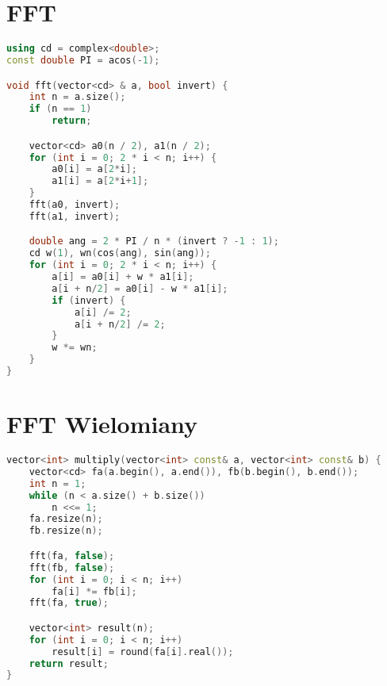 \documentclass[notitlepage]{report}
\begin{document}
\section*{FFT}
\begin{lstlisting}[language=C++,basicstyle=\footnotesize]
using cd = complex<double>;
const double PI = acos(-1);

void fft(vector<cd> & a, bool invert) {
    int n = a.size();
    if (n == 1)
        return;

    vector<cd> a0(n / 2), a1(n / 2);
    for (int i = 0; 2 * i < n; i++) {
        a0[i] = a[2*i];
        a1[i] = a[2*i+1];
    }
    fft(a0, invert);
    fft(a1, invert);

    double ang = 2 * PI / n * (invert ? -1 : 1);
    cd w(1), wn(cos(ang), sin(ang));
    for (int i = 0; 2 * i < n; i++) {
        a[i] = a0[i] + w * a1[i];
        a[i + n/2] = a0[i] - w * a1[i];
        if (invert) {
            a[i] /= 2;
            a[i + n/2] /= 2;
        }
        w *= wn;
    }
}
\end{lstlisting}
\section*{FFT Wielomiany}
\begin{lstlisting}[language=C++,basicstyle=\footnotesize]
vector<int> multiply(vector<int> const& a, vector<int> const& b) {
    vector<cd> fa(a.begin(), a.end()), fb(b.begin(), b.end());
    int n = 1;
    while (n < a.size() + b.size()) 
        n <<= 1;
    fa.resize(n);
    fb.resize(n);

    fft(fa, false);
    fft(fb, false);
    for (int i = 0; i < n; i++)
        fa[i] *= fb[i];
    fft(fa, true);

    vector<int> result(n);
    for (int i = 0; i < n; i++)
        result[i] = round(fa[i].real());
    return result;
}
\end{lstlisting}
\end{document}
